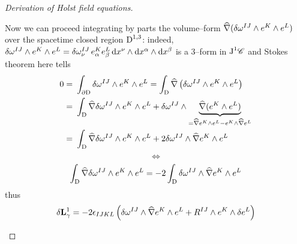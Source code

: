 \begin{proof}[Derivation of Holst field equations]
\begin{enumerate}
    Now we can proceed integrating by parts the volume--form $\widehat{\nabla}(\delta\omega^{IJ}\wedge e^K\wedge e^L)$ over the spacetime closed region $\text{\normalfont D}^{1,3}$: indeed, $\delta\omega^{IJ}\wedge e^K\wedge e^L=\delta\omega^{IJ}_\nu\,e_\alpha^Ke_\beta^L\,\text{\normalfont d} x^\nu\wedge\text{\normalfont d} x^\alpha\wedge\text{\normalfont d} x^\beta$ is a 3--form in $\text{\normalfont J}^1\mathscr{C}$ and Stokes theorem here tells
    \begin{align*}
        0=&\,\,\int_{\partial\text{\normalfont D}}\delta\omega^{IJ}\wedge e^K\wedge e^L=\int_{\text{\normalfont D}}\widehat{\nabla}\left(\delta\omega^{IJ}\wedge e^K\wedge e^L\right)\\
        =&\,\,\int_{\text{\normalfont D}}\widehat{\nabla}\delta\omega^{IJ}\wedge e^K\wedge e^L+\delta\omega^{IJ}\wedge\underbrace{\widehat{\nabla}(e^K\wedge e^L)}_{=\widehat{\nabla} e^K\wedge e^L-e^K\wedge\widehat{\nabla} e^L}\\
        =&\,\,\int_{\text{\normalfont D}}\widehat{\nabla}\delta\omega^{IJ}\wedge e^K\wedge e^L+2\delta\omega^{IJ}\wedge\widehat{\nabla} e^K\wedge e^L
    \end{align*}
    $$\Leftrightarrow$$
    $$\int_{\text{\normalfont D}}\widehat{\nabla}\delta\omega^{IJ}\wedge e^K\wedge e^L=-2\int_{\text{\normalfont D}} \delta\omega^{IJ}\wedge\widehat{\nabla} e^K\wedge e^L$$
   thus
   $$\delta\mathbf{L}^1_\gamma=-2\epsilon_{IJKL}\left(\delta\omega^{IJ}\wedge\widehat{\nabla} e^K\wedge e^L+R^{IJ}\wedge e^K\wedge\delta e^L\right)$$


\end{enumerate}
\end{proof}
